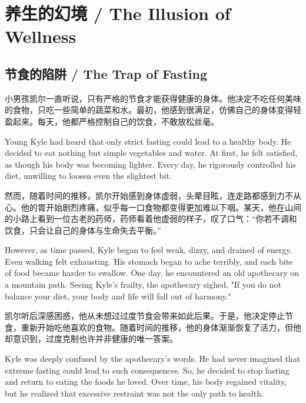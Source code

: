 \chapter*{养生的幻境 / The Illusion of Wellness}


\section*{节食的陷阱 / The Trap of Fasting}

小男孩凯尔一直听说，只有严格的节食才能获得健康的身体。他决定不吃任何美味的食物，只吃一些简单的蔬菜和水。最初，他感到很满足，仿佛自己的身体变得轻盈起来。每天，他都严格控制自己的饮食，不敢放松丝毫。

\begin{flushright}
Young Kyle had heard that only strict fasting could lead to a healthy body. He decided to eat nothing but simple vegetables and water. At first, he felt satisfied, as though his body was becoming lighter. Every day, he rigorously controlled his diet, unwilling to loosen even the slightest bit.
\end{flushright}

然而，随着时间的推移，凯尔开始感到身体虚弱，头晕目眩，连走路都感到力不从心。他的胃开始剧烈疼痛，似乎每一口食物都变得更加难以下咽。某天，他在山间的小路上看到一位古老的药师，药师看着他虚弱的样子，叹了口气：“你若不调和饮食，只会让自己的身体与生命失去平衡。”

\begin{flushright}
However, as time passed, Kyle began to feel weak, dizzy, and drained of energy. Even walking felt exhausting. His stomach began to ache terribly, and each bite of food became harder to swallow. One day, he encountered an old apothecary on a mountain path. Seeing Kyle's frailty, the apothecary sighed, "If you do not balance your diet, your body and life will fall out of harmony."
\end{flushright}

凯尔听后深感困惑，他从未想过过度节食会带来如此后果。于是，他决定停止节食，重新开始吃他喜欢的食物。随着时间的推移，他的身体渐渐恢复了活力，但他却意识到，过度克制也许并非健康的唯一答案。

\begin{flushright}
Kyle was deeply confused by the apothecary’s words. He had never imagined that extreme fasting could lead to such consequences. So, he decided to stop fasting and return to eating the foods he loved. Over time, his body regained vitality, but he realized that excessive restraint was not the only path to health.
\end{flushright}

